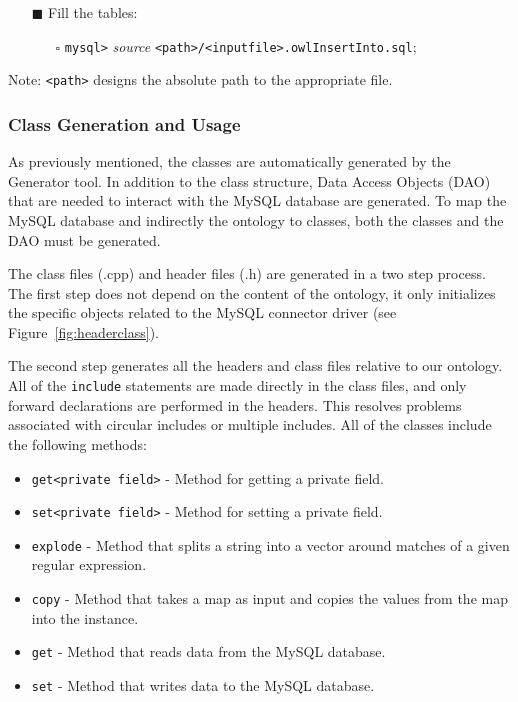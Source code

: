 \begin{itemize}
\item[\textcolor{BrickRed}{$\blacksquare$}] Fill the tables:
\begin{itemize}
 \item[\textcolor{BrickRed}{$\square$}] \texttt{mysql>} \textit{source} \texttt{<path>/<inputfile>.owlInsertInto.sql};
\end{itemize}
\end{itemize}

\textcolor{BrickRed}{Note}: \texttt{<path>} designs the absolute path to the appropriate file.

\subsubsection{{\cpp} Class Generation and Usage}
As previously mentioned, the {\cpp} classes are automatically generated by the Generator tool. In addition to the class structure, 
Data Access Objects (DAO) that are needed to interact with the MySQL database are generated. 
To map the MySQL database and indirectly the ontology to {\cpp} classes, both the {\cpp} classes and
the DAO must be generated.

The {\cpp} class files (.cpp) and header files (.h) are generated in a two step process.
The first step does not depend on the content of the ontology, it only initializes the specific objects related to the MySQL connector driver
(see Figure~\ref{fig:headerclass}).

The second step generates all the {\cpp} headers and class files relative to our ontology. 
All of the \texttt{include} statements  are made directly in the {\cpp} class files, and only forward declarations are performed in the headers. 
This resolves problems associated with circular includes or multiple includes. All of the classes include the following methods:
\begin{itemize}
\item \texttt{get<private field>} - Method for getting a private field.
\item \texttt{set<private field>} - Method for setting a private field.
\item \texttt{explode} - Method that splits a string into a vector around matches of a given regular expression. 
\item \texttt{copy} -  Method that takes a {\cpp} map as input and copies the values from the map into the instance.
\item \texttt{get} - Method that reads data from the MySQL database.
\item \texttt{set} - Method that writes data to the MySQL database.
\end{itemize}

